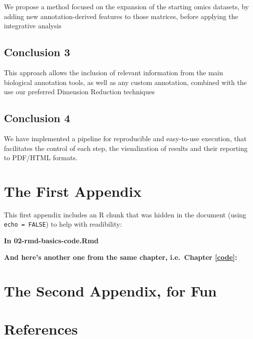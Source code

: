 \documentclass[a4paper, nobind]{templates/ociamthesis}
\begin{document}
We propose a method focused on the expansion of the starting omics datasets, by adding new annotation-derived features to those matrices, before applying the integrative analysis

\hypertarget{conclusion-3}{%
\section*{Conclusion 3}\label{conclusion-3}}

This approach allows the inclusion of relevant information from the main biological annotation tools, as well as any custom annotation, combined with the use our preferred Dimension Reduction techniques

\hypertarget{conclusion-4}{%
\section*{Conclusion 4}\label{conclusion-4}}

We have implemented a pipeline for reproducible and easy-to-use execution, that facilitates the control of each step, the visualization of results and their reporting to PDF/HTML formats.

\startappendices

\hypertarget{the-first-appendix}{%
\chapter{The First Appendix}\label{the-first-appendix}}

This first appendix includes an R chunk that was hidden in the document (using \texttt{echo\ =\ FALSE}) to help with readibility:

\textbf{In 02-rmd-basics-code.Rmd}

\textbf{And here's another one from the same chapter, i.e.~Chapter \ref{code}:}

\hypertarget{the-second-appendix-for-fun}{%
\chapter{The Second Appendix, for Fun}\label{the-second-appendix-for-fun}}

\hypertarget{references}{%
\chapter*{References}\label{references}}
\end{document}

